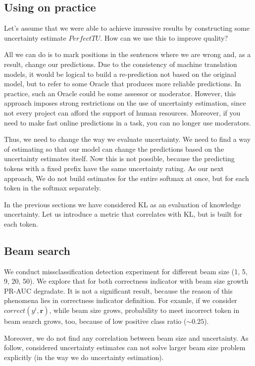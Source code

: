 \documentclass[a4paper,14pt]{extarticle}
\begin{document}
\subsection{Using on practice}
	Let's assume that we were able to achieve imressive results by constructing some uncertainty estimate $PerfectTU$. How can we use this to improve quality?

	All we can do is to mark positions in the sentences where we are wrong and, as a result, change our predictions. Due to the consistency of machine translation models, it would be logical to build a re-prediction not based on the original model, but to refer to some Oracle that produces more reliable predictions. In practice, such an Oracle could be some assessor or moderator. However, this approach imposes strong restrictions on the use of uncertainty estimation, since not every project can afford the support of human resources. Moreover, if you need to make fast online predictions in a task, you can no longer use moderators.

	Thus, we need to change the way we evaluate uncertainty. We need to find a way of estimating so that our model can change the predictions based on the uncertainty estimates itself. Now this is not possible, because the predicting tokens with a fixed prefix have the same uncertainty rating. As our next approach, We do not build estimates for the entire softmax at once, but for each token in the softmax separately.

	In the previous sections we have considered KL as an evaluation of knowledge uncertainty. Let us introduce a metric that correlates with KL, but is built for each token.
	
\subsection{Beam search}
	We conduct missclassification detection experiment for different beam size (1, 5, 9, 20, 50). We explore that for both correctness indicator with beam size growth PR-AUC degradate. It is not a significant result, because the reason of this phenomena lies in correctness indicator definition. For examle, if we consider $correct(y^i, \textbf{r})$, while beam size grows, probability to meet incorrect token in beam search grows, too, because of low positive class ratio ($\sim 0.25$).
	
	Moreover, we do not find any correlation between beam size and uncertainty. As follow, considered uncertainty estimates can not solve larger beam size problem explicitly (in the way we do uncertainty estimation).
\end{document}

